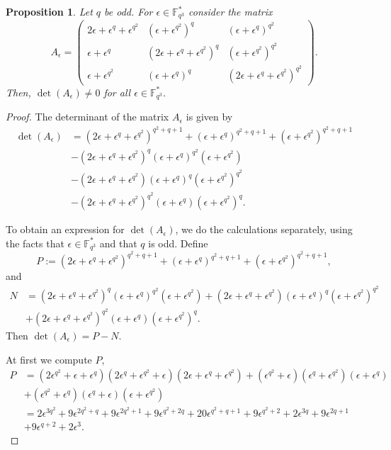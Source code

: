 \documentclass[12pt]{amsart}
\newtheorem{proposition}[theorem]{Proposition}
\def\e{\epsilon}
\def\e{\epsilon}
\begin{document}
\begin{proposition} \label{lemma Ag}
	Let $q$ be  odd. For $\e \in \mathbb{F}_{q^3}^{\ast}$ consider the matrix
	$$
	A_{\e}=\left( \begin{array}{ccc}
		2 \epsilon + \epsilon^q + \epsilon^{q^2} & ( \epsilon + \epsilon^{q^2})^q & (\epsilon + \epsilon^q)^{q^2}\\
		\epsilon + \epsilon^q & (2 \epsilon + \epsilon^q + \epsilon^{q^2})^q & ( \epsilon + \epsilon^{q^2} )^{q^2}\\
		\epsilon + \epsilon^{q^2} & (\epsilon + \epsilon^q)^q & (2 \epsilon + \epsilon^q + \epsilon^{q^2})^{q^2}
	\end{array}\right).
	$$
	Then, $\det(A_{\e}) \neq 0$ for all $\e \in \mathbb{F}_{q^3}^{\ast}$. 
\end{proposition}
\begin{proof}
	The determinant of the matrix $A_\e$ is given by
	\begin{align*}
		\det(A_{\e}) &= (2 \e + \e^q + \e^{q^2})^{q^2 + q + 1} + (\e + \e^q)^{q^2 + q +1} + (\e + \e^{q^2})^{q^2 + q + 1}\\
		& - (2 \e + \e^q + \e^{q^2})^q (\e + \e^q)^{q^2} (\e + \e^{q^2})\\
		& - (2 \e + \e^q + \e^{q^2}) (\e + \e^q)^{q} (\e + \e^{q^2})^{q^2}\\
		& - (2 \e + \e^q + \e^{q^2})^{q^2} (\e + \e^q) (\e + \e^{q^2})^q .
	\end{align*}
			
		To obtain an expression for $\det(A_{\e})$, we do the calculations separately, using the facts that $\epsilon \in \mathbb{F}_{q^3}^{\ast}$ and that $q$ is odd. 
	Define 
	\[
	P:=(2 \e + \e^q + \e^{q^2})^{q^2 + q + 1} + (\e + \e^q)^{q^2 + q +1} + (\e + \e^{q^2})^{q^2 + q + 1},
	\]
	and 
	\begin{align*}
		N&=(2 \e + \e^q + \e^{q^2})^q (\e + \e^q)^{q^2} (\e + \e^{q^2})+(2 \e + \e^q + \e^{q^2}) (\e + \e^q)^{q} (\e + \e^{q^2})^{q^2}\\
		&+(2 \e + \e^q + \e^{q^2})^{q^2} (\e + \e^q) (\e + \e^{q^2})^q.
	\end{align*}
	Then $\det(A_{\e})=P-N$.
	
	At first we compute $P$,
	\begin{align*}
		P &= (2 \e^{q^2} + \e + \e^{q}) (2 \e^q + \e^{q^2} + \e) (2 \e + \e^q + \e^{q^2}) + (\e^{q^2} + \e)(\e^q + \e^{q^2})(\e + \e^{q})\\
		& + (\e^{q^2} + \e^q) (\e^q + \e)(\e + \e^{q^2})\\
		&= 2 \e^{3 q^2} + 9 \e^{2q^2 + q} + 9 \e^{2q^2 + 1} + 9 \e^{q^2 + 2q} + 20 \e^{q^2 + q + 1} + 9 \e^{q^2 + 2} + 2 \e^{3q} + 9 \e^{2q+1}\\
		& + 9 \e^{q+2} + 2\e^3.
	\end{align*} 
	

\end{proof}
\end{document}

